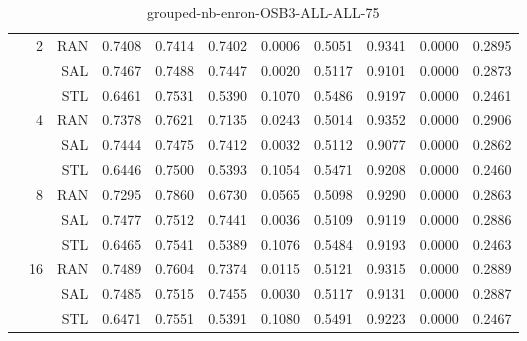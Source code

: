 \begin{center}
\begin{table}[htbp]
\begin{tabular}{ | r | r | r | r | r | r | r | r | r | r | r |}
 & \multirow{3}{*}{2} & RAN & 0.7408 & 0.7414 & 0.7402 & 0.0006 & 0.5051 & 0.9341 & 0.0000 & 0.2895\\ \cline{3-11}
 &   & SAL & 0.7467 & 0.7488 & 0.7447 & 0.0020 & 0.5117 & 0.9101 & 0.0000 & 0.2873\\ \cline{3-11}
 &   & STL & 0.6461 & 0.7531 & 0.5390 & 0.1070 & 0.5486 & 0.9197 & 0.0000 & 0.2461\\ \cline{2-11}
 & \multirow{3}{*}{4} & RAN & 0.7378 & 0.7621 & 0.7135 & 0.0243 & 0.5014 & 0.9352 & 0.0000 & 0.2906\\ \cline{3-11}
 &   & SAL & 0.7444 & 0.7475 & 0.7412 & 0.0032 & 0.5112 & 0.9077 & 0.0000 & 0.2862\\ \cline{3-11}
 &   & STL & 0.6446 & 0.7500 & 0.5393 & 0.1054 & 0.5471 & 0.9208 & 0.0000 & 0.2460\\ \cline{2-11}
 & \multirow{3}{*}{8} & RAN & 0.7295 & 0.7860 & 0.6730 & 0.0565 & 0.5098 & 0.9290 & 0.0000 & 0.2863\\ \cline{3-11}
 &   & SAL & 0.7477 & 0.7512 & 0.7441 & 0.0036 & 0.5109 & 0.9119 & 0.0000 & 0.2886\\ \cline{3-11}
 &   & STL & 0.6465 & 0.7541 & 0.5389 & 0.1076 & 0.5484 & 0.9193 & 0.0000 & 0.2463\\ \cline{2-11}
 & \multirow{3}{*}{16} & RAN & 0.7489 & 0.7604 & 0.7374 & 0.0115 & 0.5121 & 0.9315 & 0.0000 & 0.2889\\ \cline{3-11}
 &   & SAL & 0.7485 & 0.7515 & 0.7455 & 0.0030 & 0.5117 & 0.9131 & 0.0000 & 0.2887\\ \cline{3-11}
 &   & STL & 0.6471 & 0.7551 & 0.5391 & 0.1080 & 0.5491 & 0.9223 & 0.0000 & 0.2467\\ \cline{2-11}
\hline
\end{tabular}
\caption{grouped-nb-enron-OSB3-ALL-ALL-75}
\end{table}
\end{center}

